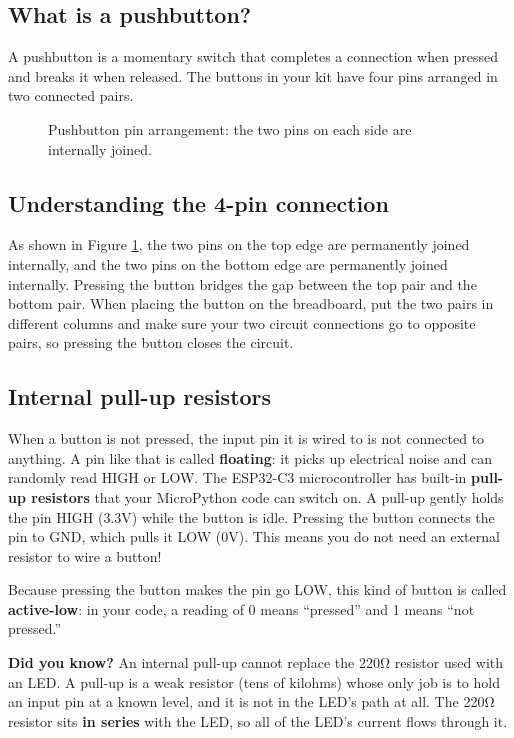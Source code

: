 \subsection{What is a pushbutton?}
A pushbutton is a momentary switch that completes a connection when pressed and breaks it when released.
The buttons in your kit have four pins arranged in two connected pairs.

\begin{figure}[H]
\centering
    \caption{Pushbutton pin arrangement: the two pins on each side are internally joined.}
    \label{fig:button_pinout}
\end{figure}

\subsection{Understanding the 4-pin connection}
As shown in Figure \ref{fig:button_pinout}, the two pins on the top edge are permanently joined internally,
and the two pins on the bottom edge are permanently joined internally. Pressing the button bridges the gap
between the top pair and the bottom pair. When placing the button on the breadboard, put the two pairs in
different columns and make sure your two circuit connections go to opposite pairs, so pressing the button
closes the circuit.

\subsection{Internal pull-up resistors}
When a button is not pressed, the input pin it is wired to is not connected to anything. A pin like that is
called \textbf{floating}: it picks up electrical noise and can randomly read HIGH or LOW. The ESP32-C3
microcontroller has built-in \textbf{pull-up resistors} that your MicroPython code can switch on. A pull-up
gently holds the pin HIGH (3.3V) while the button is idle. Pressing the button connects the pin to GND, which
pulls it LOW (0V). This means you do not need an external resistor to wire a button!

Because pressing the button makes the pin go LOW, this kind of button is called \textbf{active-low}: in your
code, a reading of 0 means ``pressed'' and 1 means ``not pressed.''

\begin{tcolorbox}[colback=blue!5!white,colframe=blue!40!black]
    \textbf{Did you know?} An internal pull-up cannot replace the 220\si{\ohm} resistor used with an LED.
    A pull-up is a weak resistor (tens of kilohms) whose only job is to hold an input pin at a known level,
    and it is not in the LED's path at all. The 220\si{\ohm} resistor sits \textbf{in series} with the LED,
    so all of the LED's current flows through it.
\end{tcolorbox}

